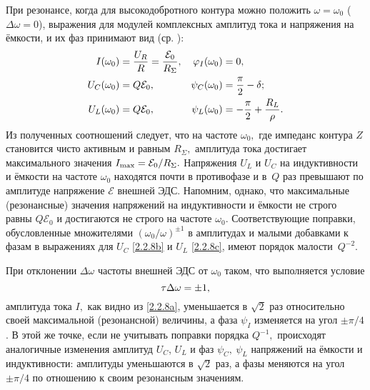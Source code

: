 При резонансе, когда для высокодобротного контура можно положить 
$\omega=\omega_0$ ($\Delta\omega=0$), 
выражения для модулей комплексных амплитуд тока и напряжения на ёмкости, 
и их фаз принимают вид (ср. ):
\begin{align}
			\eqmark{2.2.9a}
		I(\omega_0) & =\dfrac{U_R}{R}=\dfrac{\mathcal{E}_0}{R_{\Sigma}}, &
        \varphi_I(\omega_0) & = 0, \\
			\eqmark{2.2.9b}
		U_C(\omega_0) & = Q\mathcal{E}_0, &
            \psi_C(\omega_0) & = \dfrac{\pi}{2}-\delta; \\
        U_L(\omega_0) & = Q\mathcal{E}_0, &
            \psi_L(\omega_0) &=-\dfrac{\pi}{2}+\dfrac{R_L}{\rho}.
\end{align}
Из полученных соотношений следует, что на частоте $\omega_0,$ где
импеданс контура $Z$ становится чисто активным и равным $R_{\Sigma},$ амплитуда
тока достигает максимального значения $I_{\rm max}=\mathcal{E}_0/R_{\Sigma}.$
Напряжения $U_L$ и $U_C$ на индуктивности и ёмкости на частоте $\omega_0$
находятся почти в противофазе и в~$Q$ раз превышают по амплитуде напряжение
$\mathcal{E}$ внешней ЭДС. Напомним, однако, что максимальные (резонансные)
значения напряжений на индуктивности и ёмкости не
строго равны $Q\mathcal{E}_0$ и достигаются не строго на частоте $\omega_0$.
Соответствующие поправки, обусловленные множителями
$(\omega_0/\omega)^{\pm1}$ в амплитудах и малыми добавками к фазам в выражениях
для $U_C$ \eqref{2.2.8b} и $U_L$ \eqref{2.2.8c}, 
имеют порядок малости~$Q^{-2}$.

При отклонении $\Delta\omega$ частоты внешней ЭДС от $\omega_0$ таком, что
выполняется условие
\begin{equation}\eqmark{2.2.10}
\tau\Delta\omega=\pm1,
\end{equation}
амплитуда тока $I,$ как видно из \eqref{2.2.8a}, уменьшается в $\sqrt{2}$
раз относительно своей максимальной (резонансной) величины, а фаза $\psi_I$
изменяется на угол $\pm\pi/4$. 
В этой же точке, если не учитывать
поправки порядка $Q^{-1},$ происходят аналогичные изменения
амплитуд $U_C$, $U_L$ и фаз $\psi_C,~\psi_L$ напряжений на ёмкости и
индуктивности: амплитуды уменьшаются в $\sqrt{2}$ раз, а фазы меняются на угол
$\pm\pi/4$ по отношению к своим резонансным значениям.

